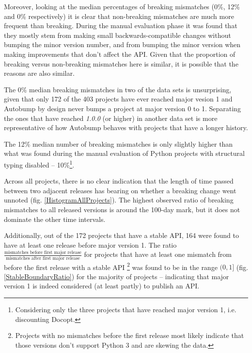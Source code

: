 \documentclass{l4proj}
\begin{document}
Moreover, looking at the median percentages of breaking mismatches
(0\%, 12\% and 0\% respectively) it is clear that non-breaking
mismatches are much more frequent than breaking. During the manual
evaluation phase it was found that they mostly stem from making small
backwards-compatible changes without bumping the minor version number,
and from bumping the minor version when making improvements that don't
affect the API. Given that the proportion of breaking versus
non-breaking mismatches here is similar, it is possible that the
reasons are also similar.

The 0\% median breaking mismatches in two of the data sets is
unsurprising, given that only 172 of the 403 projects have ever
reached major vesion 1 and Autobump by design never bumps a project at
major version 0 to 1. Separating the ones that have reached
\textit{1.0.0} (or higher) in another data set is more representative
of how Autobump behaves with projects that have a longer history.

The 12\% median number of breaking mismatches is only slightly higher
than what was found during the manual evaluation of Python projects
with structural typing disabled -- 10\%\footnote{Considering only the
three projects that have reached major version 1, i.e.
discounting Docopt.}.

Across all projects, there is no clear indication that the length of
time passed between two adjacent releases has bearing on whether a
breaking change went unnoted (fig. \ref{HistogramAllProjects}). The
highest observed ratio of breaking mismatches to all released versions
is around the 100-day mark, but it does not dominate the other time
intervals.

Additionally, out of the 172 projects that have a stable API, 164 were
found to have at least one release before major version 1. The ratio
$\frac{\text{mismatches before first major release}}{\text{mismatches
after first major release}}$ for projects that have at least one
mismatch from before the first release with a stable API
\footnote{Projects with no mismatches before the first release most
likely indicate that those versions don't support Python 3 and are
skewing the data.} was found to be in the range $(0, 1]$ (fig.
\ref{StableBoundaryRatio}) for the majority of projects -- indicating
that major version 1 is indeed considered (at least partly) to publish
an API.
\end{document}
